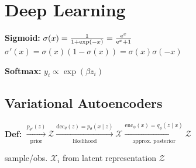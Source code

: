 \section{Deep Learning}


\textbf{Sigmoid:}\enskip
$\sigma(x) = \frac{1}{1+\exp(-x)} = \frac{\mathrm{e}^{x}}{\mathrm{e}^{x}+1}$ \\
$\sigma'(x) = \sigma(x) (1{-}\sigma(x)) = \sigma(x) \sigma(-x)$

\textbf{Softmax:}\enskip
$y_i \propto \exp(\beta z_i)$







\subsection{Variational Autoencoders}


\textbf{Def:}
$\xrightarrow[\text{prior}]{p_{\theta'}(z)} \mathcal Z
\xrightarrow[\text{likelihood}]{\mathrm{dec}_\theta(z) = p_\theta(x\mid z)} \mathcal X
\xrightarrow[\text{approx. posterior}]{\mathrm{enc}_\phi(x) = q_\phi(z\mid x)} \mathcal Z$

\hfill sample/obs. $\mathcal X_i$ from latent representation $\mathcal Z$

